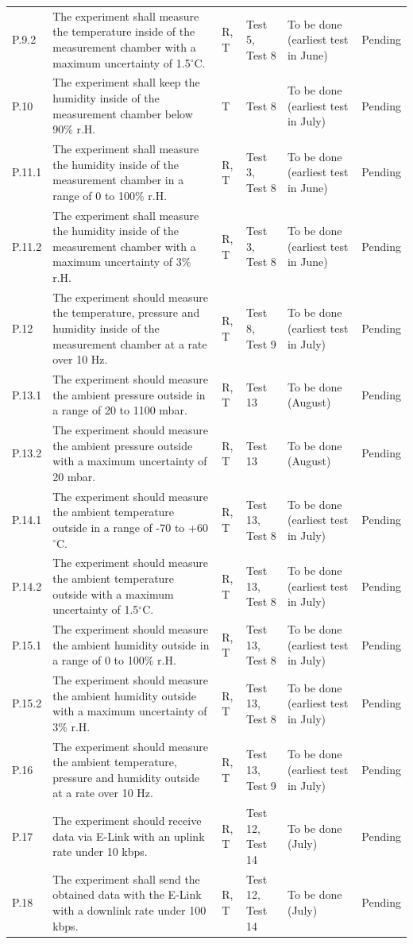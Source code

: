 \documentclass[
  a4paper,
  11pt,
  openany,
  parskip,
  toc=totoc,
  listof=totoc,
  bibliography=totoc
]{scrreprt}
\newcommand{\degree}{\ensuremath{^\circ}} %
\begin{document}
\begin{longtable}{L{0.7cm}L{5cm}L{1.5cm}L{2cm}L{2.5cm}L{2cm}}
P.9.2 & The experiment shall measure the temperature inside of the measurement chamber with a maximum uncertainty of 1.5\degree C. & R, T & Test 5, Test 8 & To be done (earliest test in June) & Pending \\
P.10 & The experiment shall keep the humidity inside of the measurement chamber below 90\% r.H. & T & Test 8 & To be done (earliest test in July) & Pending \\
P.11.1 & The experiment shall measure the humidity inside of the measurement chamber in a range of 0 to 100\% r.H. & R, T & Test 3, Test 8 & To be done (earliest test in June) & Pending \\
P.11.2 & The experiment shall measure the humidity inside of the measurement chamber with a maximum uncertainty of 3\% r.H. & R, T & Test 3, Test 8 & To be done (earliest test in June) & Pending \\

P.12 & The experiment should measure the temperature, pressure and humidity inside of the measurement chamber at a rate over 10 Hz. & R, T & Test 8, Test 9 & To be done (earliest test in July) & Pending \\
P.13.1 & The experiment should measure the ambient pressure outside in a range of 20 to 1100 mbar. & R, T & Test 13 & To be done (August) & Pending \\
P.13.2 & The experiment should measure the ambient pressure outside with a maximum uncertainty of 20 mbar. & R, T & Test 13 & To be done (August) & Pending  \\
P.14.1 & The experiment should measure the ambient temperature outside in a range of -70 to +60 \degree C. & R, T & Test 13, Test 8 & To be done (earliest test in July) & Pending \\
P.14.2 & The experiment should measure the ambient temperature outside with a maximum uncertainty of 1.5\degree C. & R, T & Test 13, Test 8 & To be done (earliest test in July) & Pending \\
P.15.1 & The experiment should measure the ambient humidity outside in a range of 0 to 100\% r.H. & R, T & Test 13, Test 8 & To be done (earliest test in July) & Pending \\
P.15.2 & The experiment should measure the ambient humidity outside with a maximum uncertainty of 3\% r.H. & R, T & Test 13, Test 8 & To be done (earliest test in July) & Pending \\
P.16 & The experiment should measure the ambient temperature, pressure and humidity outside at a rate over 10 Hz. & R, T & Test 13, Test 9 & To be done (earliest test in July) & Pending \\
P.17 & The experiment should receive data via E-Link with an uplink rate under 10 kbps. & R, T & Test 12, Test 14 & To be done (July) & Pending \\
P.18 & The experiment shall send the obtained data with the E-Link with a downlink rate under 100 kbps. & R, T & Test 12, Test 14 & To be done (July)& Pending \\


\end{longtable}
\end{document}
